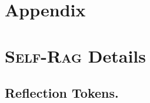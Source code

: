 \documentclass{article} %
\newcommand{\model}{\textsc{Self-Rag}\xspace}
\begin{document}



\clearpage
\appendix
\section*{Appendix}

\startcontents[sections]
\newpage


\section{\model Details} 
\subsection{Reflection Tokens.}
\label{sec:data_collection_gpt4}
\end{document}
